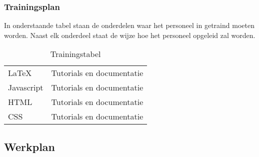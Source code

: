 \subsubsection{Trainingsplan}
In onderstaande tabel staan de onderdelen waar het personeel in getraind moeten worden. Naast elk onderdeel staat de wijze hoe het personeel opgeleid zal worden.

\begin{table}[h]
\begin{tabular}{l|l}
LaTeX      & Tutorials en documentatie \\
Javascript & Tutorials en documentatie  \\
HTML       & Tutorials en documentatie  \\
CSS        & Tutorials en documentatie 
\end{tabular}
\caption{Trainingstabel}
\label{tab:training}
\end{table}

\subsection{Werkplan}
